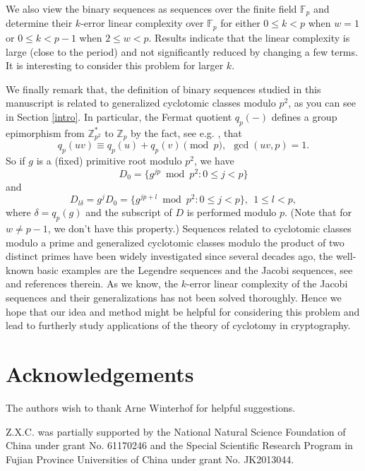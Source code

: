 \documentclass [11pt,a4paper]{article}
\def\F{\mathbb{F}}
\def\Z{\mathbb{Z}}
\begin{document}
We also view the binary sequences as sequences over the finite field $\F_p$
and determine their $k$-error linear complexity over $\F_p$ for either $0\le k<p$ when $w=1$ or $0\le k<p-1$ when $2\le w<p$. Results indicate that the linear complexity is large (close to the period) and  not significantly reduced by changing a few terms. It is interesting to consider this problem for larger $k$.





We finally remark that, the definition of binary sequences studied in this manuscript is related to
generalized cyclotomic classes modulo $p^2$, as you can see in Section \ref{intro}. In particular, the Fermat quotient
 $q_p(-)$ defines a group epimorphism from $\Z_{p^2}^*$ to $\Z_p$ by the fact, see e.g. \cite{OS}, that
$$
q_p(uv) \equiv q_p(u) + q_p(v) \pmod p, ~~\gcd(uv,p)=1.
$$
So if $g$ is a (fixed) primitive root modulo $p^2$, we have
$$
D_0=\{g^{jp} \bmod {p^2} : 0\le j<p\}
$$
and
$$
 D_{l\delta}=g^jD_0=\{g^{jp+l} \bmod {p^2} : 0\le j<p\},~~ 1\le l<p,
$$
where $\delta =q_p(g)$  and the subscript of $D$ is performed modulo $p$. (Note that for $w\neq p-1$, we don't have this property.) Sequences related to cyclotomic classes modulo a prime and generalized cyclotomic classes modulo the product of two
distinct primes have been widely investigated since several decades ago, the well-known basic examples are the Legendre sequences and the Jacobi sequences, see \cite{CDR,D97,D98,DHS} and references therein. As we know, the $k$-error linear complexity of the Jacobi sequences and their generalizations \cite{D97,D98} has not been solved thoroughly.
Hence we hope that our idea and method might be helpful for considering this problem and lead to furtherly study applications of the theory of cyclotomy in cryptography.





\section*{Acknowledgements}

The authors wish  to thank Arne Winterhof for helpful suggestions.




Z.X.C. was partially supported by the National Natural Science
Foundation of China under grant No. 61170246 and the Special Scientific Research Program in Fujian Province Universities of China under grant No. JK2013044.
\end{document}

